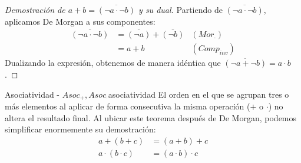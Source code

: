 {\begin{proof}[Demostración de $a + b = \overline{(\neg a \cdot \neg b)}$ y su dual]
Partiendo de $\overline{(\neg a \cdot \neg b)}$, aplicamos De Morgan a sus componentes:
\begin{align*}
    \overline{(\neg a \cdot \neg b)} &= \overline{(\neg a)} + \overline{(\neg b)} & (Mor_\cdot) \\
    &= a + b & (Comp_{inv})
\end{align*}
Dualizando la expresión, obtenemos de manera idéntica que $\overline{(\neg a + \neg b)} = a \cdot b$.
\end{proof}
}

\begin{teorema}{Asociatividad - $Asoc_+, Asoc_\cdot$}{asociatividad}
El orden en el que se agrupan tres o más elementos al aplicar de forma consecutiva la misma operación ($+$ o $\cdot$) no altera el resultado final. Al ubicar este teorema después de De Morgan, podemos simplificar enormemente su demostración:
\begin{align*}
    a + (b + c) &= (a + b) + c \\
    a \cdot (b \cdot c) &= (a \cdot b) \cdot c
\end{align*}
\end{teorema}
